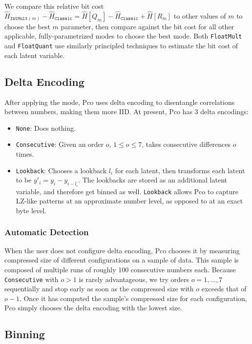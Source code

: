 \documentclass[letterpaper]{article}
\begin{document}
We compare this relative bit cost $\hat{H}_{\texttt{IntMult}(m)} - \hat{H}_\texttt{Classic} = \hat{H}[Q_m] - \hat{H}_\texttt{Classic} + \hat{H}[R_m]$ to other values of $m$ to choose the best $m$ parameter, then compare against the bit cost for all other applicable, fully-parametrized modes to choose the best mode.
Both \texttt{FloatMult} and \texttt{FloatQuant} use similarly principled techniques to estimate the bit cost of each latent variable.

\subsection{Delta Encoding}

After applying the mode, Pco uses delta encoding to disentangle correlations between numbers, making them more IID.
At present, Pco has 3 delta encodings: 

\begin{itemize}
\item \texttt{None}: Does nothing.
\item \texttt{Consecutive}: Given an order $o$, $1 \le o \le 7$, takes consecutive differences $o$ times.
\item \texttt{Lookback}: Chooses a lookback $l_i$ for each latent, then transforms each latent to be $y'_i = y_i - y_{i - l_i}$.
The lookbacks are stored as an additional latent variable, and therefore get binned as well.
\texttt{Lookback} allows Pco to capture LZ-like patterns at an approximate number level, as opposed to at an exact byte level.
\end{itemize}

\subsubsection{Automatic Detection}

When the user does not configure delta encoding, Pco chooses it by measuring compressed size of different configurations on a sample of data.
This sample is composed of multiple runs of roughly 100 consecutive numbers each.
Because \texttt{Consecutive} with $o>1$ is rarely advantageous, we try orders $o = 1, \ldots, 7$ sequentially and stop early as soon as the compressed size with $o$ exceeds that of $o - 1$.
Once it has computed the sample's compressed size for each configuration, Pco simply chooses the delta encoding with the lowest size.

\subsection{Binning}
\end{document}
